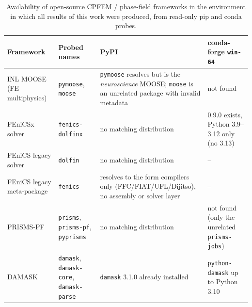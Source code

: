 \documentclass[12pt,a4paper,twocolumn]{article}
\begin{document}
\begin{table}[htbp]
\centering
\caption{Availability of open-source CPFEM / phase-field frameworks in the environment in which all
results of this work were produced, from read-only pip and conda probes.}
\label{tab:framework_availability}
\footnotesize
\setlength{\tabcolsep}{4pt}
\begin{tabular}{p{}p{}p{}p{}}
\toprule
\textbf{Framework} & \textbf{Probed names} & \textbf{PyPI} & \textbf{conda-forge \texttt{win-64}} \\
\midrule
INL MOOSE (FE multiphysics) & \texttt{pymoose}, \texttt{moose} & \texttt{pymoose} resolves but is the \emph{neuroscience} MOOSE; \texttt{moose} is an unrelated package with invalid metadata & not found \\
FEniCSx solver & \texttt{fenics-dolfinx} & no matching distribution & 0.9.0 exists, Python 3.9--3.12 only (no 3.13) \\
FEniCS legacy solver & \texttt{dolfin} & no matching distribution & -- \\
FEniCS legacy meta-package & \texttt{fenics} & resolves to the form compilers only (FFC/FIAT/UFL/Dijitso), no assembly or solver layer & -- \\
PRISMS-PF & \texttt{prisms}, \texttt{prisms-pf}, \texttt{pyprisms} & no matching distribution & not found (only the unrelated \texttt{prisms-jobs}) \\
DAMASK & \texttt{damask}, \texttt{damask-core}, \texttt{damask-parse} & \texttt{damask} 3.1.0 already installed & \texttt{python-damask} up to Python 3.10 \\
\bottomrule
\end{tabular}
\end{table}
\end{document}
